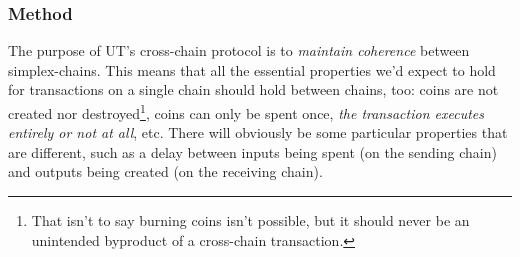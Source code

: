 \subsubsection{Method}



The purpose of UT's cross-chain protocol is to \emph{maintain coherence} between simplex-chains.
This means that all the essential properties we'd expect to hold for transactions on a single chain should hold between chains, too: coins are not created nor destroyed\footnote{
    That isn't to say burning coins isn't possible, but it should never be an unintended byproduct of a cross-chain transaction.
}, coins can only be spent once, \emph{the transaction executes entirely or not at all}, etc.
There will obviously be some particular properties that are different, such as a delay between inputs being spent (on the sending chain) and outputs being created (on the receiving chain).



